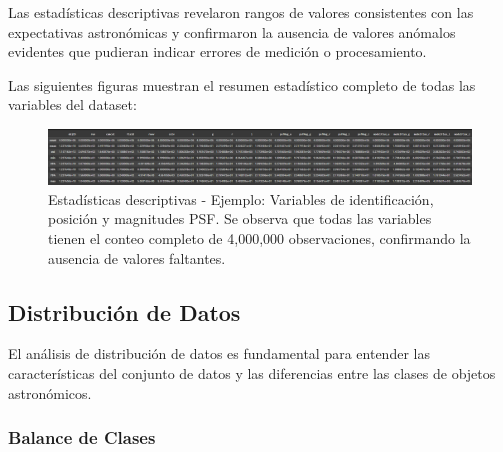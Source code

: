 \documentclass{article}
\begin{document}
Las estadísticas descriptivas revelaron rangos de valores consistentes con las expectativas astronómicas y confirmaron la ausencia de valores anómalos evidentes que pudieran indicar errores de medición o procesamiento.

Las siguientes figuras muestran el resumen estadístico completo de todas las variables del dataset:

\begin{figure}[H]
    \centering
    \includegraphics[width=1.0\linewidth]{describe_1.png}
    \caption{Estadísticas descriptivas - Ejemplo: Variables de identificación, posición y magnitudes PSF. Se observa que todas las variables tienen el conteo completo de 4,000,000 observaciones, confirmando la ausencia de valores faltantes.}
    \label{fig:describe1}
\end{figure}




\subsection{Distribución de Datos}

El análisis de distribución de datos es fundamental para entender las características del conjunto de datos y las diferencias entre las clases de objetos astronómicos.

\subsubsection{Balance de Clases}
\end{document}
